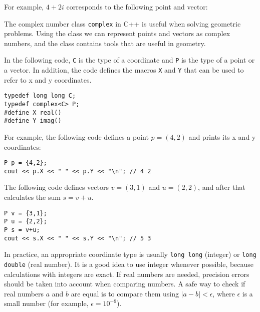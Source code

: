 For example, $4+2i$ corresponds to the
following point and vector:

\begin{center}
\end{center}


The complex number class \texttt{complex} in C++ is
useful when solving geometric problems.
Using the class we can represent points and vectors
as complex numbers, and the class contains tools
that are useful in geometry.

In the following code, \texttt{C} is the type of
a coordinate and \texttt{P} is the type of a point or a vector.
In addition, the code defines the macros \texttt{X} and \texttt{Y}
that can be used to refer to x and y coordinates.

\begin{lstlisting}
typedef long long C;
typedef complex<C> P;
#define X real()
#define Y imag()
\end{lstlisting}

For example, the following code defines a point $p=(4,2)$
and prints its x and y coordinates:

\begin{lstlisting}
P p = {4,2};
cout << p.X << " " << p.Y << "\n"; // 4 2
\end{lstlisting}

The following code defines vectors $v=(3,1)$ and $u=(2,2)$,
and after that calculates the sum $s=v+u$.

\begin{lstlisting}
P v = {3,1};
P u = {2,2};
P s = v+u;
cout << s.X << " " << s.Y << "\n"; // 5 3
\end{lstlisting}

In practice,
an appropriate coordinate type is usually
\texttt{long long} (integer) or \texttt{long double}
(real number).
It is a good idea to use integer whenever possible,
because calculations with integers are exact.
If real numbers are needed,
precision errors should be taken into account
when comparing numbers.
A safe way to check if real numbers $a$ and $b$ are equal
is to compare them using $|a-b|<\epsilon$,
where $\epsilon$ is a small number (for example, $\epsilon=10^{-9}$).


